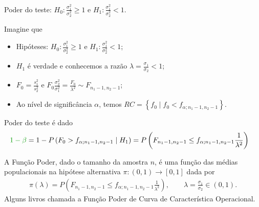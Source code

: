 \documentclass[9pt]{beamer}
\begin{document}
\begin{frame}{Poder do teste: $H_0:\frac{\sigma_1^2}{\sigma_2^2} \geq 1$ e $H_1:\frac{\sigma_1^2}{\sigma_2^2} < 1$.}

\normalsize

Imagine que
\begin{itemize}
	\item Hipóteses: $H_0:\frac{\sigma_1^2}{\sigma_2^2} \geq 1$ e $H_1:\frac{\sigma_1^2}{\sigma_2^2} < 1$;
	\item $H_1$ é verdade e conhecemos a razão $\lambda=\frac{\sigma_1}{\sigma_2} < 1$;
	\item $F_0 = \frac{s_1^2}{s_2^2}$ e $F_0 \frac{\sigma_2^2}{\sigma_1^2} = \frac{F_0}{\lambda^2} \sim F_{n_1-1, n_2-1}$;
	\item Ao nível de significância $\alpha$, temos $RC = \left\{ f_0 \mid f_0 < f_{\alpha; n_1-1, n_2-1} \right\}$.
\end{itemize}
\vfill	

Poder do teste é dado
\begin{align*}
\textcolor{important}{1-\beta} &=1 - P\left( F_0 > f_{\alpha; n_1-1, n_2-1} \mid H_1\right)=  P \left(F_{n_1-1, n_2-1} \leq f_{\alpha; n_1-1, n_2-1} \frac{1}{\lambda^2} \right)
\end{align*}
\vfill

A \textcolor{important}{Função Poder}, dado o tamanho da amostra $n$, é uma função das médias populacionais na hipótese alternativa  $\pi: (0,1) \longrightarrow [0,1]$ dada por
\begin{align*}
\pi(\lambda) = P \left(F_{n_1-1, n_2-1} \leq f_{\alpha; n_1-1, n_2-1} \frac{1}{\lambda^2} \right), \qquad \lambda = \frac{\sigma_1}{\sigma_2} \in (0, 1).
\end{align*}
Alguns livros chamada a Função Poder de \textcolor{important}{Curva de Característica Operacional.}

\normalsize
\end{frame}
\end{document}
